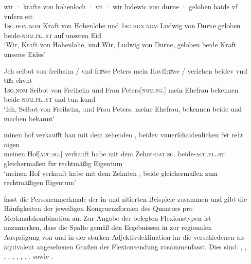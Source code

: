 \begin{exe}
\ex \label{ex:beid2coordncao2}
	\begin{xlist}
	\ex \label{ex:beid2coordncao2_1}
		\gll wir · krafte von hohenloch · vn̄ · wir ludewic
			von durne · geloben baide vf vnſern eit \\
			\textsc{1sg\subM.hon.nom} {} Kraft von Hohenlohe {} und {}
			\textsc{1sg\subM.hon.nom} Ludwig von Durne {} geloben
			beide-\textsc{nom.pl.\MascM.st} auf unseren Eid \\
		\trans `Wir, Kraft von Hohenlohe, und Wir, Ludwig von Durne,
			geloben beide Kraft unseres Eides'
			\parencites(Nr.~2529, Burg Hohlach, Kr.~Neustadt an der Aisch-Bad Windsheim)[563,5--6]{cao3}

	\ex \label{ex:beid2coordncao2_2}
		\gll Jch seibot von freihaim / vnd fraͮwe Peters mein
			Havſfraͮwe / veriehen beidev vnd tuͦn chvnt \\
			\textsc{1sg\subM.nom} Seibot von Freiheim {} und Frau
			Peters[\textsc{nom.sg.\FemF}] mein Ehefrau {} bekennen
			beide-\textsc{nom.pl.\NeutMF.st} und tun kund \\
		\trans `Ich, Seibot von Freiheim, und Frau Peters, meine Ehefrau,
			bekennen beide und machen bekannt'
			\parencites(Nr.~3248, München, 1299)[416,23]{cao4}

	\ex \label{ex:beid2coordncao2_3}
		\gll minen hof \textelp{} verkaufft han mit dem
			zehenden \textelp{}, beidev vnuerſchaidenlichen
			fvͤr reht aigen \\
			meinen Hof[\textsc{acc.sg.\MascI}] {} verkauft habe mit dem
			Zehnt-\textsc{dat.sg.\MascI} {} beide-\textsc{acc.pl.\NeutI.st}
			gleichermaßen für rechtmäßig Eigentum \\
		\trans `meinen Hof verkauft habe mit dem Zehnten \textelp{}, beide
			gleichermaßen zum rechtmäßigen Eigentum'
			\parencites(Nr.~N~241, Augsburg, 1283)[195,37--39]{cao5}
	\end{xlist}
\end{exe}

 fasst die Personenmerkmale der in
 und  zitierten Beispiele
zusammen und gibt die Häufigkeiten der jeweiligen Kongruenzformen des Quantors
pro Merkmalskombination an. Zur Angabe der belegten Flexionstypen ist
anzumerken, dass die Spalte  gemäß den Ergebnissen in
 zur regionalen Ausprägung von  und 
in der starken Adjektivdeklination im \CAO{} die verschiedenen als äquivalent
angesehenen Grafien der Flexionsendung zusammenfasst. Dies sind:
,
,
,
,
,
,
,
,
,
sowie
.


